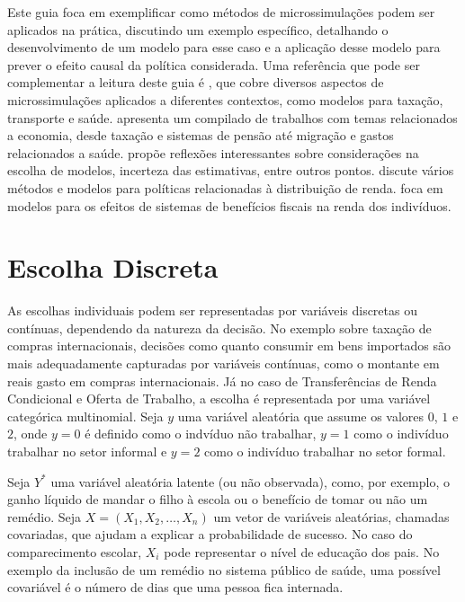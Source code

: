\documentclass[12pt]{article}
\theoremstyle{break}
\begin{document}
Este guia foca em exemplificar como métodos de microssimulações podem ser aplicados na prática, discutindo um exemplo específico, detalhando o desenvolvimento de um modelo para esse caso e a aplicação desse modelo para prever o efeito causal da política considerada. Uma referência que pode ser complementar a leitura deste guia é \textcite{o2014handbook}, que cobre diversos aspectos de microssimulações aplicados a diferentes contextos, como modelos para taxação, transporte e saúde. \textcite{mitton2000microsimulation} apresenta um compilado de trabalhos com temas relacionados a economia, desde taxação e sistemas de pensão até migração e gastos relacionados a saúde. \textcite[capítulo~1]{mitton2000microsimulation} propõe reflexões interessantes sobre considerações na escolha de modelos, incerteza das estimativas, entre outros pontos. \textcite{odonoghue2021} discute vários métodos e modelos para políticas relacionadas à distribuição de renda. \textcite{figari2015} foca em modelos para os efeitos de sistemas de benefícios fiscais na renda dos indivíduos. 







\section{Escolha Discreta}
\label{sec:discrete_choice}
As escolhas individuais podem ser representadas por variáveis discretas ou contínuas, dependendo da natureza da decisão. No exemplo sobre taxação de compras internacionais, decisões como  quanto consumir em bens importados são mais adequadamente capturadas por variáveis contínuas, como o montante em reais gasto em compras internacionais. Já no caso de Transferências de Renda Condicional e Oferta de Trabalho, a escolha é representada por uma variável categórica multinomial. Seja \( y \) uma variável aleatória que assume os valores \( 0 \), \( 1 \) e \( 2 \), onde \( y = 0 \) é definido como o indvíduo não trabalhar, \( y = 1 \) como o indivíduo trabalhar no setor informal e \( y = 2 \) como o indivíduo trabalhar no setor formal.

Seja \( Y^* \) uma variável aleatória latente (ou não observada), como, por exemplo, o ganho líquido de mandar o filho à escola ou o benefício de tomar ou não um remédio. Seja \( X = (X_1, X_2, \ldots, X_n) \) um vetor de variáveis aleatórias, chamadas covariadas, que ajudam a explicar a probabilidade de sucesso. No caso do comparecimento escolar, \( X_i \) pode representar o nível de educação dos pais. No exemplo da inclusão de um remédio no sistema público de saúde, uma possível covariável é o número de dias que uma pessoa fica internada.
\end{document}
